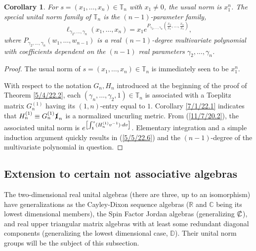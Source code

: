 \documentclass{amsart}
\numberwithin{equation}{section}
\newtheorem{corollary}[theorem]{Corollary}
\theoremstyle{definition}
\numberwithin{theorem}{section}
\begin{document}
\begin{corollary}\label{5/17/22.1} For $s= (x_1,\dots,x_n)\in \mathbb{T}_n$ with $x_1\ne 0$, the usual norm is $x_1^n$.  The special unital norm family of $\mathbb{T}_n$ is the $(n-1)$-parameter family,
\begin{equation} \label{5/5/22.6} \ell_{\gamma_2,\dots,\gamma_n}(x_1,\dots,x_n) = x_1 e^{P_{\gamma_2,\dots,\gamma_n}\left(\frac{x_2}{x_1},\dots,\frac{x_n}{x_1}\right)},\end{equation} where $P_{\gamma_2,\dots,\gamma_n}(w_1,\dots,w_{n-1})$ is a real $(n-1)$-degree multivariate polynomial with coefficients dependent on the $(n-1)$ real parameters $\gamma_2,\dots,\gamma_n$.    \end{corollary}

\begin{proof} The usual norm of $s=(x_1,\dots,x_n)\in \mathbb{T}_n$ is immediately seen to be $x_1^n$.

With respect to the notation $G_n,H_n$ introduced at the beginning of the proof of Theorem \ref{5/4/22.2}, each $(\gamma_n,\dots,\gamma_2,1)\in\mathbb{T}_n$ is associated with a Toeplitz matrix $G_n^{(1)}$ having its $(1,n)$-entry equal to $1$.  Corollary \ref{7/1/22.1} indicates that $H^{(1)}_n\equiv G_n^{(1)}\slashed{\bf 1}_n$ is a normalized uncurling metric. From (\ref{11/7/20.2}),  the associated unital norm is $e^{\left[\int_{\bf 1}^s (H_n^{(1)} v^{-1})\cdot dv\right]}$.  Elementary integration and a simple induction argument quickly results in (\ref{5/5/22.6}) and the $(n-1)$-degree of the multivariate polynomial in question.
\end{proof}
 
 \subsection{Extension to certain not associative algebras}
The two-dimensional real unital algebras (there are three, up to an isomorphism) have generalizations as the Cayley-Dixon sequence algebras ($\mathbb{R}$ and $\mathbb{C}$ being its lowest dimensional members),  the Spin Factor Jordan algebras (generalizing $\slashed{\mathbb{C}}$), and real upper triangular matrix algebras with at least some redundant diagonal components (generalizing the lowest dimensional case, $\mathbb{D}$).  Their unital norm groups will be the subject of this subsection. 
\end{document}
